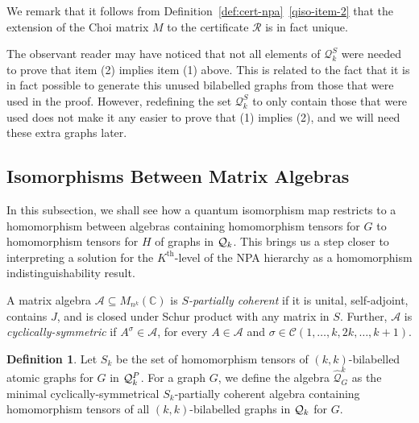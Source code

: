 \documentclass[11pt,a4paper]{article}
\theoremstyle{plain}
\theoremstyle{remark}
\theoremstyle{definition}
\newtheorem{definition}[thm]{Definition}
\newcommand{\complex}{\mathbb{C}}
\def\calA{{\mathcal A}} \def\calB{{\mathcal B}} \def\calC{{\mathcal C}}
\newcommand{\cyclicpermutations}{\mathscr{C}(1,\dots, k, 2k, \dots, k+1)}
\begin{document}
We remark that it follows from Definition~\ref{def:cert-npa}~\ref{qiso-item-2} that the extension of the Choi matrix $M$ to the certificate $\mathcal{R}$ is in fact unique.

The observant reader may have noticed that not all elements of $\mathcal{Q}_k^S$ were needed to prove that item (2) implies item (1) above. This is related to the fact that it is in fact possible to generate this unused bilabelled graphs from those that were used in the proof. However, redefining the set $\mathcal{Q}_k^S$ to only contain those that were used does not make it any easier to prove that (1) implies (2), and we will need these extra graphs later.






































\subsection{Isomorphisms Between Matrix Algebras}

 In this subsection, we shall see how a quantum isomorphism map restricts to a homomorphism between algebras containing homomorphism tensors for $G$ to homomorphism tensors for $H$ of graphs in ${\mathcal Q}_k$. This brings us a step closer to interpreting a solution for the $K^{\text{th}}$-level of the NPA hierarchy as a homomorphism indistinguishability result. 

A matrix algebra $\calA \subseteq M_{n^k}(\complex)$ is \emph{$S$-partially coherent} if it is unital, self-adjoint, contains $J$, and is closed under Schur product with any matrix in $S$. 
Further, $\calA$ is \emph{cyclically-symmetric} if $A^\sigma \in \calA$, for every $A \in \calA$ and $\sigma \in \cyclicpermutations$.

\begin{definition}
  Let $S_k$ be the set of homomorphism tensors of $(k, k)$-bilabelled atomic graphs for $G$ in ${\mathcal Q}_k^P$.
  For a graph $G$, we define the algebra $\widehat{\mathcal{Q}}_G^k$ as the minimal cyclically-symmetrical $S_k$-partially coherent algebra containing homomorphism tensors of all $(k,k)$-bilabelled graphs in ${\mathcal Q}_k$ for $G$.
\end{definition}
\end{document}
